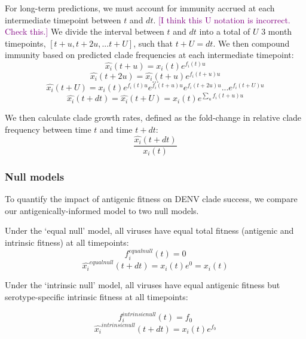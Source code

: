 \documentclass[11pt,oneside,letterpaper]{article}
\def\sbc#1{\textcolor{purple}{[#1]}}
\begin{document}
For long-term predictions, we must account for immunity accrued at each intermediate timepoint between $t$ and $dt$.
\sbc{I think this U notation is incorrect. Check this.}
We divide the interval between $t$ and $dt$ into a total of $U$ 3 month timepoints, $[t+u, t+2u, ... t+U]$, such that $t+U=dt$.
We then compound immunity based on predicted clade frequencies at each intermediate timepoint:
\begin{equation}
\hat{x_i}(t+u) = x_i(t)e^{f_i(t) u}
\end{equation}
\begin{equation}
\hat{x_i}(t+2u) = \hat{x_i}(t+u) e^{f_i(t+u)u}
\end{equation}
$$...$$
\begin{equation}
\hat{x_i}(t+U) = x_i(t) e^{f_i(t)u} e^{f_i(t+u)u} e^{f_i(t+2u)u} ... e^{f_i(t+U)u}
\end{equation}
\begin{equation}
  \label{eq_compounding_immunity}
\hat{x_i}(t+dt) = \hat{x_i}(t+U) = x_i(t) e^{\sum_{u}f_i(t+u)u}
\end{equation}

We then calculate clade growth rates, defined as the fold-change in relative clade frequency between time $t$ and time $t+dt$:
\begin{equation}
  \label{eq_growth_rate}
\frac{\hat{x_i}(t+dt)}{x_i(t)}
\end{equation}

\subsubsection{Null models}
To quantify the impact of antigenic fitness on DENV clade success, we compare our antigenically-informed model to two null models.

Under the `equal null' model, all viruses have equal total fitness (antigenic and intrinsic fitness) at all timepoints:
\begin{equation}
  \label{equal_null}
f_i^{equal null}(t) = 0
\end{equation}
\begin{equation}
\hat{x_i}^{equal null}(t+dt) = x_i(t) e^0 = x_i(t)
\end{equation}

Under the `intrinsic null' model, all viruses have equal antigenic fitness but serotype-specific intrinsic fitness at all timepoints:

\begin{equation}
  \label{intrinsic_null}
  f_i^{intrinsic null}(t) = f_0
\end{equation}
\begin{equation}
\hat{x_i}^{intrinsic null}(t+dt) = x_i(t) e^{f_0}
\end{equation}
\end{document}
